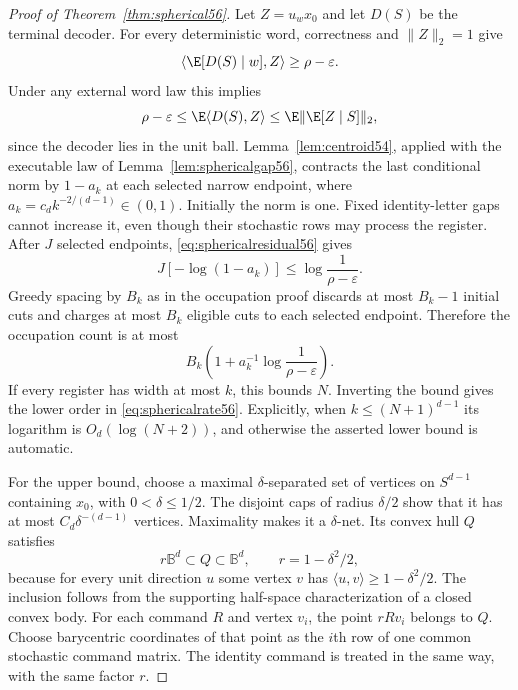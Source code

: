 \begin{proof}[Proof of Theorem~\ref{thm:spherical56}]
Let $Z=u_wx_0$ and let $D(S)$ be the terminal decoder. For every deterministic word, correctness and $\|Z\|_2=1$ give
\[
           \langle\E[D(S)\mid w],Z\rangle\ge\rho-\varepsilon.
\]
Under any external word law this implies
\begin{equation}\label{eq:sphericalresidual56}
       \rho-\varepsilon\le\E\langle D(S),Z\rangle
             \le\E\|\E[Z\mid S]\|_2,
\end{equation}
since the decoder lies in the unit ball. Lemma~\ref{lem:centroid54}, applied with the executable law of Lemma~\ref{lem:sphericalgap56}, contracts the last conditional norm by $1-a_k$ at each selected narrow endpoint, where $a_k=c_d k^{-2/(d-1)}\in(0,1)$. Initially the norm is one. Fixed identity-letter gaps cannot increase it, even though their stochastic rows may process the register. After $J$ selected endpoints, \eqref{eq:sphericalresidual56} gives
\[
            J[-\log(1-a_k)]\le\log\frac1{\rho-\varepsilon}.
\]
Greedy spacing by $B_k$ as in the occupation proof discards at most $B_k-1$ initial cuts and charges at most $B_k$ eligible cuts to each selected endpoint. Therefore the occupation count is at most
\begin{equation}\label{eq:sphericaloccupation56}
 B_k\left(1+a_k^{-1}\log\frac1{\rho-\varepsilon}\right).
\end{equation}
If every register has width at most $k$, this bounds $N$. Inverting the bound gives the lower order in \eqref{eq:sphericalrate56}. Explicitly, when $k\le(N+1)^{d-1}$ its logarithm is $O_d(\log(N+2))$, and otherwise the asserted lower bound is automatic.

For the upper bound, choose a maximal $\delta$-separated set of vertices on $S^{d-1}$ containing $x_0$, with $0<\delta\le1/2$. The disjoint caps of radius $\delta/2$ show that it has at most $C_d\delta^{-(d-1)}$ vertices. Maximality makes it a $\delta$-net. Its convex hull $Q$ satisfies
\begin{equation}\label{eq:sphericalpolytope56}
                r\mathbb B^d\subset Q\subset\mathbb B^d,
                         \qquad r=1-\delta^2/2,
\end{equation}
because for every unit direction $u$ some vertex $v$ has $\langle u,v\rangle\ge1-\delta^2/2$. The inclusion follows from the supporting half-space characterization of a closed convex body. For each command $R$ and vertex $v_i$, the point $rRv_i$ belongs to $Q$. Choose barycentric coordinates of that point as the $i$th row of one common stochastic command matrix. The identity command is treated in the same way, with the same factor $r$.


\end{proof}
